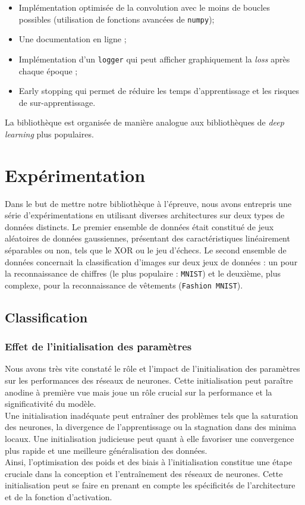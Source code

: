 \documentclass{article}
\begin{document}
\begin{itemize}
    \item Implémentation optimisée de la convolution avec le moins de boucles possibles (utilisation de fonctions avancées de \texttt{numpy}); 
    \item Une documentation en ligne ;
    \item Implémentation d'un \texttt{logger} qui peut afficher graphiquement la \textit{loss} après chaque époque ; 
    \item Early stopping qui permet de réduire les temps d'apprentissage et les risques de sur-apprentissage.
\end{itemize}

La bibliothèque est organisée de manière analogue aux bibliothèques de \textit{deep learning} plus populaires.

\section{Expérimentation}

Dans le but de mettre notre bibliothèque à l'épreuve, nous avons entrepris une série d'expérimentations en utilisant diverses architectures sur deux types de données distincts. Le premier ensemble de données était constitué de jeux aléatoires de données gaussiennes, présentant des caractéristiques linéairement séparables ou non, tels que le XOR ou le jeu d'échecs. Le second ensemble de données concernait la classification d'images sur deux jeux de données : un pour la reconnaissance de chiffres (le plus populaire : \texttt{MNIST}) et le deuxième, plus complexe, pour la reconnaissance de vêtements (\texttt{Fashion MNIST}).

\subsection{Classification}

\subsubsection{Effet de l'initialisation des paramètres}

Nous avons très vite constaté le rôle et l'impact de l'initialisation des paramètres sur les performances des réseaux de neurones. Cette initialisation peut paraître anodine à première vue mais joue un rôle crucial sur la performance et la significativité du modèle. \\
Une initialisation inadéquate peut entraîner des problèmes tels que la saturation des neurones, la divergence de l'apprentissage ou la stagnation dans des minima locaux. Une initialisation judicieuse peut quant à elle favoriser une convergence plus rapide et une meilleure généralisation des données. \\
Ainsi, l'optimisation des poids et des biais à l'initialisation constitue une étape cruciale dans la conception et l'entraînement des réseaux de neurones. Cette initialisation peut se faire en prenant en compte les spécificités de l'architecture et de la fonction d'activation.
\end{document}
